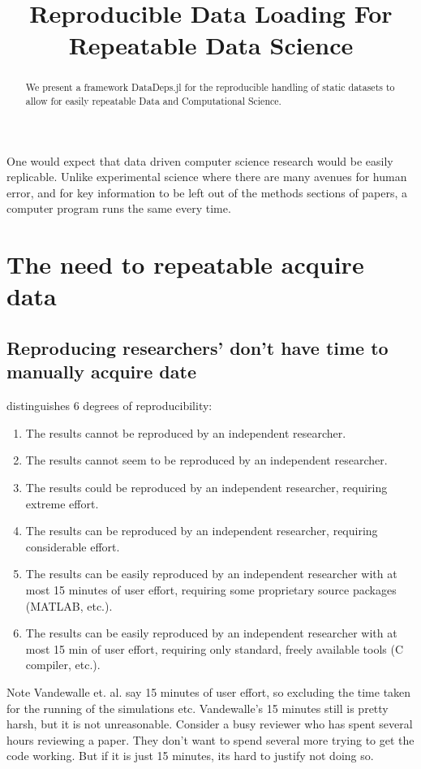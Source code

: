 \documentclass[]{article}
\title{Reproducible Data Loading For Repeatable Data Science}
\author{}
\newcommand{\tcite}{\cite}
\begin{document}
\maketitle

\begin{abstract}
We present a framework DataDeps.jl for the reproducible handling of static datasets to allow for easily repeatable Data and Computational Science.


\end{abstract}


One would expect that data driven computer science research would be easily replicable.
Unlike experimental science where there are many avenues for human error, and for key information to be left out of the methods sections of papers, a computer program runs the same every time.


\section{The need to repeatable acquire data}

\subsection{Reproducing researchers' don't have time to manually acquire date}
\tcite{VabdewakkeReproduceableResearch} distinguishes 6 degrees of reproducibility:
\begin{enumerate}
\addtocounter{enumi}{-1} %
\item The results cannot be reproduced by an independent researcher.
\item The results cannot seem to be reproduced by an independent researcher.
\item The results could be reproduced by an independent researcher, requiring extreme effort. 
\item The results can be reproduced by an independent researcher, requiring considerable effort.
\item The results can be easily reproduced by an independent researcher with at most 15 minutes of user effort, requiring some proprietary source packages (MATLAB, etc.).
\item The results can be easily reproduced by an independent researcher with at most 15 min of user effort, requiring only standard, freely available tools (C compiler, etc.).
\end{enumerate}
Note Vandewalle et. al. say 15 minutes of user effort, so excluding the time taken for the running of the simulations etc.
Vandewalle's 15 minutes still is pretty harsh, but it is not unreasonable.
Consider a busy reviewer who has spent several hours reviewing a paper.
They don't want to spend several more trying to get the code working.
But if it is just 15 minutes, its hard to justify not doing so.
\end{document}
